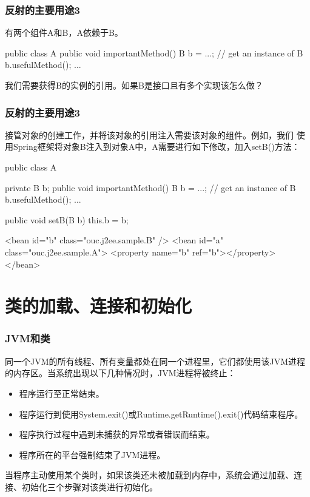 \begin{frame}[fragile] %
  \frametitle{反射的主要用途3}


  有两个组件A和B，A依赖于B。

  \begin{javaCode}
    public class A {
      public void importantMethod() {
        B b = ...; // get an instance of B
        b.usefulMethod();
        ...
      }
    }
  \end{javaCode}

  我们需要获得B的实例的引用。如果B是接口且有多个实现该怎么做？

\end{frame}

\begin{frame}[fragile] %
  \frametitle{反射的主要用途3}


  接管对象的创建工作，并将该对象的引用注入需要该对象的组件。例如，我们
  使用Spring框架将对象B注入到对象A中，A需要进行如下修改，加入setB()方法：

  \begin{javaCode}
    public class A {
      private B b;
      public void importantMethod() {
        B b = ...; // get an instance of B
        b.usefulMethod();
        ...
      }

      public void setB(B b) {
        this.b = b;
      }
    }   

  \end{javaCode}


  \begin{xmlCode}
    <bean id="b" class="ouc.j2ee.sample.B" />
    <bean id="a" class="ouc.j2ee.sample.A">
      <property name="b" ref="b"></property>
    </bean>
  \end{xmlCode}
\end{frame}

\section{类的加载、连接和初始化}

\begin{frame}[fragile] %
\frametitle{JVM和类}

同一个JVM的所有线程、所有变量都处在同一个进程里，它们都使用该JVM进程的内存区。当系统出现以下几种情况时，JVM进程将被终止：

\begin{itemize}\kai
\item 程序运行至正常结束。
\item 程序运行到使用System.exit()或Runtime.getRuntime().exit()代码结束程序。
\item 程序执行过程中遇到未捕获的异常或者错误而结束。
\item 程序所在的平台强制结束了JVM进程。
\end{itemize}

{\hei 当程序主动使用某个类时，如果该类还未被加载到内存中，系统会通过{\Red 加载、连接、初始化}三个步骤对该类进行初始化。}
\end{frame}

